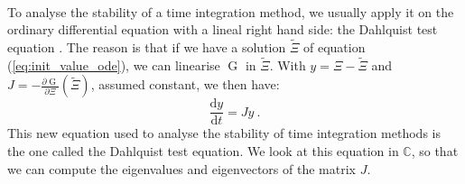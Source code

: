         \paragraph{}
        To analyse the stability of a time integration method, we usually apply it on the ordinary differential equation with a lineal right hand side: the Dahlquist test equation \cite{HairerWanner1996}.
        The reason is that if we have a solution $\tilde{\Xi}$ of equation (\ref{eq:init_value_ode}), we can linearise $\operatorname{G}$ in $\tilde{\Xi}$.
        With $y = \Xi - \tilde{\Xi}$ and $J = -\frac{\partial \operatorname{G}}{\partial \Xi}\left(\tilde{\Xi}\right)$, assumed constant, we then have:
        \begin{equation}\label{eq:dahlquist}
          \frac{\mathrm{d} y}{\mathrm{d} t} = J y \ .
        \end{equation}
        This new equation used to analyse the stability of time integration methods is the one called the Dahlquist test equation.
        We look at this equation in $\mathbb{C}$, so that we can compute the eigenvalues and eigenvectors of the matrix $J$.

